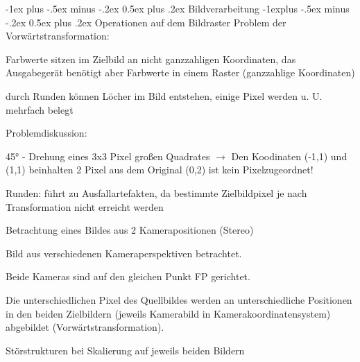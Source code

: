 \documentclass[landscape]{article}
\makeatletter
\renewcommand{\section}{\@startsection{section}{1}{0mm}%
                                {-1ex plus -.5ex minus -.2ex}%
                                {0.5ex plus .2ex}%
                                {\normalfont\large\bfseries}}
\renewcommand{\subsection}{\@startsection{subsection}{2}{0mm}%
                                {-1explus -.5ex minus -.2ex}%
                                {0.5ex plus .2ex}%
                                {\normalfont\normalsize\bfseries}}
\makeatother
\begin{document}
\begin{multicols}{3}
  
  \newpage
  \section{Bildverarbeitung}
  \subsection{Operationen auf dem Bildraster}
  Problem der Vorwärtstransformation:
  \begin{itemize*}
    \item Farbwerte sitzen im Zielbild an nicht ganzzahligen Koordinaten, das Ausgabegerät benötigt aber Farbwerte in einem Raster (ganzzahlige Koordinaten)
    \item durch Runden können Löcher im Bild entstehen, einige Pixel werden u. U. mehrfach belegt
  \end{itemize*}
  
  
  Problemdiskussion: 
  \begin{itemize*}
    \item 45° - Drehung eines 3x3 Pixel großen Quadrates $\rightarrow$ Den Koodinaten (-1,1) und (1,1) beinhalten 2 Pixel aus dem Original (0,2) ist kein Pixelzugeordnet!
    \item Runden: führt zu Ausfallartefakten, da bestimmte Zielbildpixel je nach Transformation nicht erreicht werden
    \item Betrachtung eines Bildes aus 2 Kamerapositionen (Stereo)
    \begin{itemize*}
      \item Bild aus verschiedenen Kameraperspektiven betrachtet.
      \item Beide Kameras sind auf den gleichen Punkt FP gerichtet.
      \item Die unterschiedlichen Pixel des Quellbildes werden an unterschiedliche Positionen in den beiden Zielbildern (jeweils Kamerabild in Kamerakoordinatensystem) abgebildet (Vorwärtstransformation).
      \item Störstrukturen bei Skalierung auf jeweils beiden Bildern
    \end{itemize*}
  \end{itemize*}
  

\end{multicols}
\end{document}
